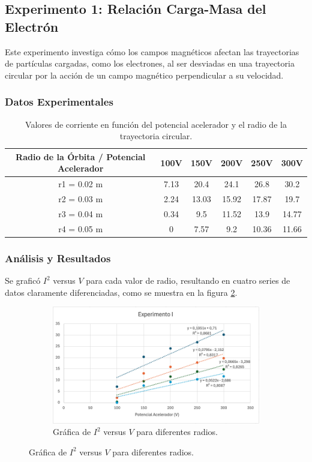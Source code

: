 \subsection{Experimento 1: Relación Carga-Masa del Electrón}
Este experimento investiga cómo los campos magnéticos afectan las trayectorias de partículas cargadas, como los electrones, al ser desviadas en una trayectoria circular por la acción de un campo magnético perpendicular a su velocidad.

\subsubsection{Datos Experimentales}
\begin{table}[H]
\centering
\begin{tabular}{|c|c|c|c|c|c|}
\hline
\textbf{Radio de la Órbita / Potencial Acelerador} & \textbf{100V} & \textbf{150V} & \textbf{200V} & \textbf{250V} & \textbf{300V} \\
\hline
r1 = 0.02 m & 7.13 & 20.4 & 24.1 & 26.8 & 30.2 \\
r2 = 0.03 m & 2.24 & 13.03 & 15.92 & 17.87 & 19.7 \\
r3 = 0.04 m & 0.34 & 9.5 & 11.52 & 13.9 & 14.77 \\
r4 = 0.05 m & 0 & 7.57 & 9.2 & 10.36 & 11.66 \\
\hline
\end{tabular}
\caption{Valores de corriente en función del potencial acelerador y el radio de la trayectoria circular.}
\end{table}

\subsubsection{Análisis y Resultados}
Se graficó \( I^2 \) versus \( V \) para cada valor de radio, resultando en cuatro series de datos claramente diferenciadas, como se muestra en la figura \ref{fig:grafica-experimento1}.

\begin{figure}[H]
  \centering
  \begin{subfigure}[b]{\textwidth}
      \centering
      \includegraphics[width=\textwidth]{Figures/1. Content/grafica-experimento-1.png}
      \caption{Gráfica de \( I^2 \) versus \( V \) para diferentes radios.}
      \label{fig:grafica-experimento1}
  \end{subfigure}
  \hfill
\end{figure}

